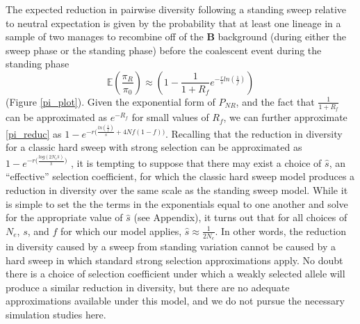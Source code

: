 \documentclass[a4paper,10pt]{article}
\begin{document}
The expected reduction in pairwise diversity following a standing sweep relative to neutral expectation is given by the probability that at least one lineage in a sample of two manages to recombine off of the \textbf{B} background (during either the sweep phase or the standing phase) before the coalescent event during the standing phase
\begin{equation}
	\mathbb{E}\left(\frac{\pi_R}{\pi_0}\right) \approx \left(1-\frac{1}{1 + R_f} e^{-\frac{r}{s}ln\left(\frac{1}{f}\right)}  \right) \label{pi_reduc}
\end{equation}
(Figure \ref{pi_plot}).
Given the exponential form of $P_{NR}$, and the fact that $\frac{1}{1+R_f}$ can be approximated as $e^{-R_f}$ for small values of $R_f$, we can further approximate \eqref{pi_reduc} as $1- e^{-r\bigl(\frac{ln\left(\frac{1}{f}\right)}{s} + 4Nf(1-f)\bigr)}$. Recalling that the reduction in diversity for a classic hard sweep with strong selection can be approximated as $1- e^{-r\bigl(\frac{log\left(2N_e \hat{s}\right)}{\hat{s}}\bigr)}$ \citep{Durrett:2004fl,Pennings2006}, it is tempting to suppose that there may exist a choice of $\hat{s}$, an ``effective'' selection coefficient, for which the classic hard sweep model produces a reduction in diversity over the same scale as the standing sweep model. While it is simple to set the the terms in the exponentials equal to one another and solve for the appropriate value of $\hat{s}$ (see Appendix), it turns out that for all choices of $N_e$, $s$, and $f$ for which our model applies, $\hat{s} \approx \frac{1}{2N_e}$. In other words, the reduction in diversity caused by a sweep from standing variation cannot be caused by a hard sweep in which standard strong selection approximations apply. No doubt there is a choice of selection coefficient under which a weakly selected allele will produce a similar reduction in diversity, but there are no adequate approximations available under this model, and we do not pursue the necessary simulation studies here.
\end{document}
